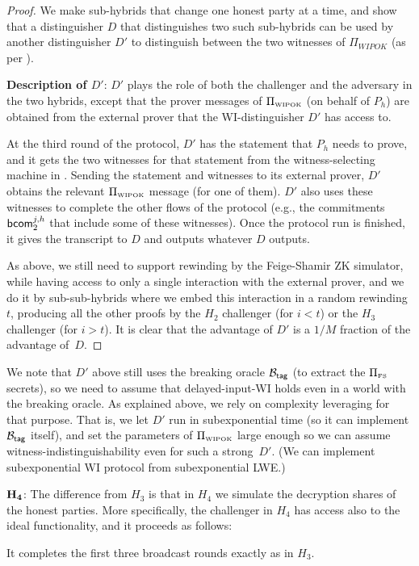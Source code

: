 \begin{proof}
We make sub-hybrids that change one honest party at a time, and show that a distinguisher $D$ that distinguishes two such sub-hybrids can be used by another distinguisher $D'$ to distinguish between the two witnesses of $\Pi_{WIPOK}$ (as per ).

{\bf Description of $D'$}: $D'$ plays the role of both the challenger and the adversary in the two hybrids, except that the prover messages of $\Pi_{\scriptscriptstyle\mathrm{WIPOK}}$ (on behalf of $P_h$) are obtained from the external prover that the WI-distinguisher $D'$ has access to.

At the third round of the protocol, $D'$ has the statement that $P_h$ needs to prove, and it gets the two witnesses for that statement from the witness-selecting machine in . Sending the statement and witnesses to its external prover, $D'$ obtains the relevant $\Pi_{\scriptscriptstyle\mathrm{WIPOK}}$ message (for one of them). $D'$ also uses these witnesses to complete the other flows of the protocol (e.g., the commitments ${\mathsf{bcom}}_2^{j,h}$ that include some of these witnesses). Once the protocol run is finished, it gives the transcript to $D$ and outputs whatever $D$ outputs.

As above, we still need to support rewinding by the Feige-Shamir ZK simulator, while having access to only a single interaction with the external prover, and we do it by sub-sub-hybrids where we embed this interaction in a random rewinding~$t$, producing all the other proofs by the $H_2$ challenger (for $i<t$) or the $H_3$ challenger (for $i>t$). It is clear that the advantage of $D'$ is a $1/M$ fraction of the advantage of~$D$.
\end{proof}

\medskip
We note that $D'$ above still uses the breaking oracle $\mathcal{B}_{\mathsf{tag}}$ (to extract the $\Pi_{{\scriptscriptstyle\mathrm{FS}}}$ secrets), so we need to assume that delayed-input-WI holds even in a world with the breaking oracle. As explained above, we rely on complexity leveraging for that purpose. That is, we let $D'$ run in subexponential time (so it can implement $\mathcal{B}_{\mathsf{tag}}$ itself), and set the parameters of $\Pi_{\scriptscriptstyle\mathrm{WIPOK}}$ large enough so we can assume witness-indistinguishability even for such a strong~$D'$. (We can implement subexponential WI protocol from subexponential LWE.)

\smallskip
\item{$\bf H_4$:} The difference from $H_3$ is that in $H_4$ we simulate the decryption shares of the honest parties. More specifically, the challenger in $H_4$ has access also to the ideal functionality, and it proceeds as follows:
\BE
\item It completes the first three broadcast rounds exactly as in $H_3$.

